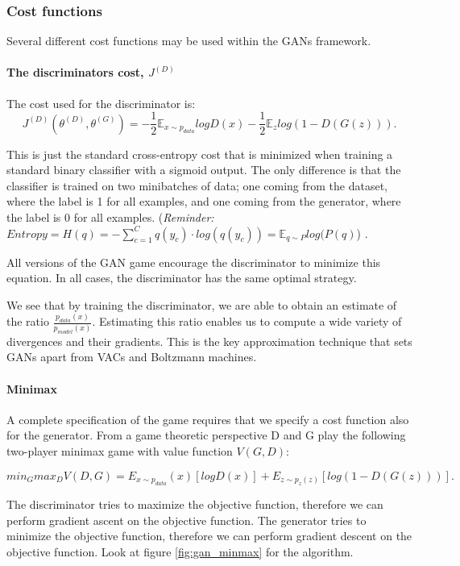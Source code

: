 \subsubsection{Cost functions}
Several different cost functions may be used within the GANs framework.

\paragraph{The discriminators cost, $J^{(D)}$}
The cost used for the discriminator is:
$$J^{(D)}(\theta^{(D)},\theta^{(G)}) = -\frac{1}{2} \mathbb{E}_{x \sim{} p_{data}} log D(x) - \frac{1}{2} \mathbb{E}_z log(1 - D(G(z))).$$

This is just the standard cross-entropy cost that is minimized when training
a standard binary classifier with a sigmoid output. The only difference is that the classifier is trained on two minibatches of data; one coming from the dataset, where the label is 1 for all examples, and one coming from the generator, where the label is 0 for all examples. (\textit{Reminder:} $Entropy = H(q) = - \sum_{c=1}^C q(y_c) \cdot log(q(y_c)) = \mathbb{E}_{q\sim{}P} log(P(q)$) \cite{demys-tds}.

All versions of the GAN game encourage the discriminator to minimize this equation. In all cases, the discriminator has the same optimal strategy.

We see that by training the discriminator, we are able to obtain an estimate of the ratio $\frac{p_{data}(x)}{p_{model}(x)}$. Estimating this ratio enables us to compute a wide variety of divergences and their gradients. This is the key approximation technique that sets GANs apart from VACs and Boltzmann machines.
\paragraph{Minimax}
A complete specification of the game requires that we specify a cost function also for the generator. From a game theoretic perspective D and G play the following two-player minimax game with value function $V(G, D)$:

$$min_G max_D V (D, G) = E_{x\sim{}p_{data}}(x)[log D(x)] + E_{z\sim{}p_z(z)}[log(1 - D(G(z)))].$$

The discriminator tries to maximize the objective function, therefore we can perform gradient ascent on the objective function. The generator tries to minimize the objective function, therefore we can perform gradient descent on the objective function. Look at figure \ref{fig:gan_minmax} for the algorithm.

